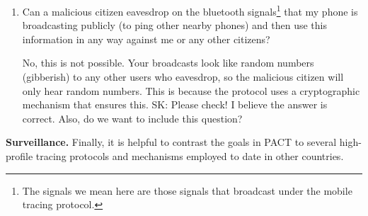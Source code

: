 \documentclass{article}
\newcommand{\TODO}[1]{ {\color{blue} #1 }}
\begin{document}
\begin{enumerate}[leftmargin=*]
\item Can a malicious citizen eavesdrop on the bluetooth signals\footnote{The signals we mean here are those signals that broadcast under the mobile tracing protocol.} that my phone is broadcasting publicly (to ping other nearby phones) and then use this information in any way against me or any other citizens?

   No, this is not possible. Your broadcasts look like random numbers (gibberish) to any other users who eavesdrop, so the malicious citizen will only hear random numbers. This is because the protocol uses a cryptographic mechanism that ensures this.  \TODO{SK: Please check! I believe the answer is correct. Also, do we want to include this question?} 

\end{enumerate}

\iffalse
\subsection{Mobile-assisted, contact tracing questions}

\begin{enumerate}[leftmargin=*]
\item For this protocol, what data is stored on my phone? What data is stored 

and, for "interviews", all the data remains on the user's device, except for what they voluntarily reveal to others of the end users choice, e.g., healthcare authorities or other users of the system, in order to enable contact tracing.  Mobile tracing is the most important protocol to explicitly examine to see if it is consistent with the basic principles of civil liberties, while also being helpful for contact tracing.

The data on the phone can be encrypted and can be set up to automatically time out based on end-user controlled policies.  This would prevent the dataset from being accessed or requested via legal subpoena or other governmental programs and policies.

\end{enumerate}
\fi

\textbf{Surveillance.} 
Finally, it is helpful to contrast the goals in PACT to several high-profile tracing protocols and mechanisms employed to date in other countries.
\end{document}
